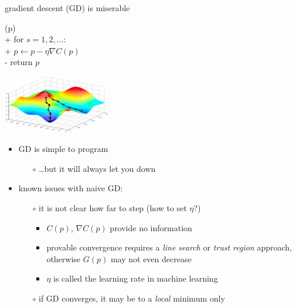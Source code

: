 \documentclass[xcolor={svgnames},
               hyperref={colorlinks,citecolor=DeepPink4,linkcolor=FireBrick,urlcolor=Maroon}]
               {beamer}
\newcommand{\grad}{\nabla}
\begin{document}
\begin{frame}{gradient descent (GD) is miserable}

\begin{pseudo*}
(p)\text{:} \\+
    for $s = 1,2,\dots$: \\+
        $p \gets p - \eta \grad C(p)$ \\-
    return $p$
\end{pseudo*}

\vspace{-25mm}
\hfill \includegraphics[width=0.35\textwidth]{figs/gdsurface} \phantom{adslj}

\medskip
\begin{itemize}
\item GD is simple to program
    \begin{itemize}
    \item[$\circ$] \dots but it will always let you down
    \end{itemize}
\item known issues with naive GD:
    \begin{itemize}
    \item[$\circ$] it is not clear how far to step \hfill (how to set $\eta$?)
        \begin{itemize}
        \item $C(p)$, $\grad C(p)$ provide no information
        \item provable convergence requires a \emph{line search} or \emph{trust region} approach,  otherwise $G(p)$ may not even decrease
        \item $\eta$ is called the \alert{learning rate} in machine learning
        \end{itemize}
    \item[$\circ$] if GD converges, it may be to a \emph{local} minimum only
    \end{itemize}
\end{itemize}
\end{frame}
\end{document}
